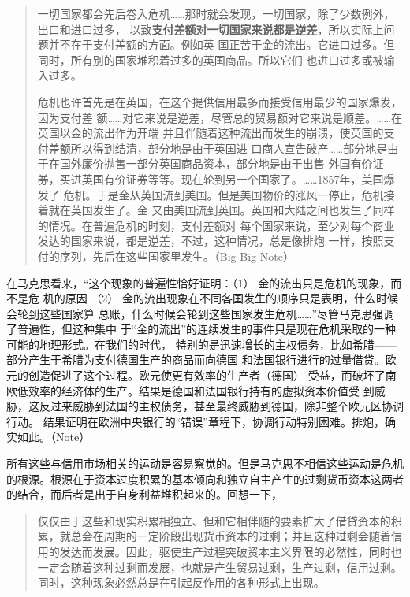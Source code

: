 \begin{quotation}
一切国家都会先后卷入危机……那时就会发现，一切国家，除了少数例外，出口和进口过多，
以致\textbf{支付差额对一切国家来说都是逆差}，所以实际上问题并不在于支付差额的方面。例如英
国正苦于金的流出。它进口过多。但同时，所有别的国家堆积着过多的英国商品。所以它们
也进口过多或被输入过多。 

危机也许首先是在英国，在这个提供信用最多而接受信用最少的国家爆发，因为支付差
额……对它来说是逆差，尽管总的贸易额对它来说是顺差。……在英国以金的流出作为开端
并且伴随着这种流出而发生的崩溃，使英国的支付差额所以得到结清，部分地是由于英国进
口商人宣告破产……部分地是由于在国外廉价抛售一部分英国商品资本，部分地是由于出售
外国有价证券，买进英国有价证券等等。现在轮到另一个国家了。……1857年，美国爆发了
危机。于是金从英国流到美国。但是美国物价的涨风一停止，危机接着就在英国发生了。金
又由美国流到英国。英国和大陆之间也发生了同样的情况。在普遍危机的时刻，支付差额对
每个国家来说，至少对每个商业发达的国家来说，都是逆差，不过，这种情况，总是像排炮
一样，按照支付的序列，先后在这些国家里发生。（Big Big Note）

\end{quotation}

在马克思看来，“这个现象的普遍性恰好证明：（1） 金的流出只是危机的现象，而不是危
机的原因 （2） 金的流出现象在不同各国发生的顺序只是表明，什么时候会轮到这些国家算
总账，什么时候会轮到这些国家发生危机……”尽管马克思强调了普遍性，但这种集中
于“金的流出”的连续发生的事件只是现在危机采取的一种可能的地理形式。在我们的时代，
特别的是迅速增长的主权债务，比如希腊——部分产生于希腊为支付德国生产的商品而向德国
和法国银行进行的过量借贷。欧元的创造促进了这个过程。欧元使更有效率的生产者（德国）
受益，而破坏了南欧低效率的经济体的生产。结果是德国和法国银行持有的虚拟资本价值受
到威胁，这反过来威胁到法国的主权债务，甚至最终威胁到德国，除非整个欧元区协调行动。
结果证明在欧洲中央银行的“错误”章程下，协调行动特别困难。排炮，确实如此。（Note）

所有这些与信用市场相关的运动是容易察觉的。但是马克思不相信这些运动是危机的根源。根源在于资本过度积累的基本倾向和独立自主产生的过剩货币资本这两者的结合，而后者是出于自身利益堆积起来的。回想一下，

\begin{quotation}
仅仅由于这些和现实积累相独立、但和它相伴随的要素扩大了借贷资本的积累，就总会在周期的一定阶段出现货币资本的过剩；并且这种过剩会随着信用的发达而发展。因此，驱使生产过程突破资本主义界限的必然性，同时也一定会随着这种过剩而发展，也就是产生贸易过剩，生产过剩，信用过剩。同时，这种现象必然总是在引起反作用的各种形式上出现。 

\end{quotation}

